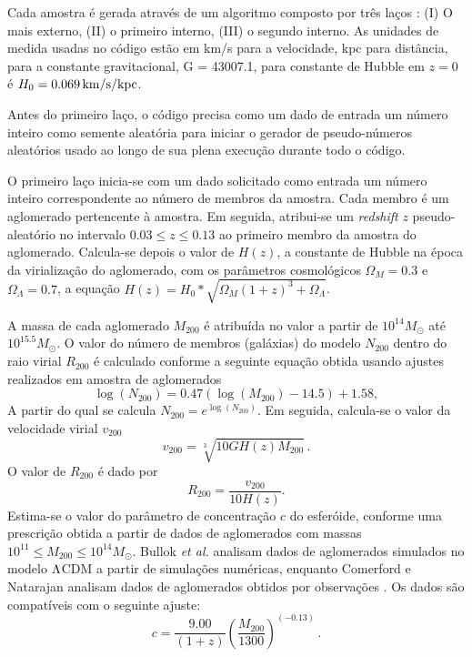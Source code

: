 \par Cada amostra \'e gerada atrav\'es de um algoritmo composto por tr\^es la\c cos : (I) O mais externo, (II) o primeiro interno, (III) o segundo interno. As unidades de medida usadas no c\'odigo est\~ao em km/s para a velocidade, kpc para dist\^ancia, para a constante gravitacional, G = 43007.1, para constante de Hubble em $z=0$ \'e $H_0 = 0.069 \, {\rm km/s/kpc}$.
\par Antes do primeiro la\c co, o c\'odigo precisa como um dado de entrada um n\'umero inteiro como semente aleat\'oria para iniciar o gerador de pseudo-n\'umeros aleat\'orios usado ao longo de sua plena execu\c c\~ao durante todo o c\'odigo. 
\par O primeiro la\c co inicia-se com um dado solicitado como entrada um n\'umero inteiro correspondente ao n\'umero de membros da amostra. Cada membro \'e um aglomerado pertencente \`a amostra. Em seguida, atribui-se um \textit{redshift} $z$ pseudo-aleat\'orio no intervalo $0.03 \leq z \leq 0.13$ ao primeiro membro da amostra do aglomerado. Calcula-se depois o valor de $H(z)$, a constante de Hubble na \'epoca da virializa\c c\~ao do aglomerado, com os par\^ametros cosmol\'ogicos $\Omega_M = 0.3$ e $\Omega_{\Lambda}=0.7$, a equa\c c\~ao $H(z) = H_0*\sqrt{\Omega_M(1+z)^3 + \Omega_{\Lambda}}$.

A massa de cada aglomerado $M_{200}$ \'e atribu\'ida no valor a partir de $10^{14} M_{\odot}$ at\'e $10^{15.5}M_{\odot}$. O valor do n\'umero de membros (gal\'axias) do modelo $N_{200}$ dentro do raio virial $R_{200}$ \'e calculado conforme a seguinte equa\c c\~ao obtida usando ajustes realizados em amostra de aglomerados\cite{andreon2012}
\begin{equation}
\log(N_{200}) = 0.47(\log(M_{200}) - 14.5) + 1.58,
\label{andreon}	
\end{equation}	
A partir do qual se calcula $N_{200} = e^{\log(N_{200})}$. Em seguida, calcula-se o valor da velocidade virial $v_{200}$\cite{springel1999}
\begin{equation}
v_{200} = \sqrt[3]{10GH(z)M_{200}} \, .
\label{velocidadevirial}
\end{equation}	
O valor de $R_{200}$ \'e dado por 
\begin{equation} R_{200} = \frac{v_{200}}{10H(z)}.
\label{rvirial}
\end{equation}
Estima-se o valor do par\^ametro de concentra\c c\~ao $c$ do esfer\'oide, conforme uma prescri\c c\~ao obtida a partir de dados de aglomerados com massas $10^{11} \leq M_{200} \leq 10^{14} M_{\odot}$\cite{Bullock}.  Bullok {\it et al.} analisam dados de aglomerados simulados no modelo ${\rm \Lambda}$CDM\cite{Bullock} a partir de simula\c c\~oes num\'ericas, enquanto Comerford e Natarajan analisam dados de aglomerados obtidos por observa\c c\~oes \cite{COMERFORD}. Os dados s\~ao compat\'iveis com o seguinte ajuste:
\begin{equation}
c = \frac{9.00}{(1+z)} \left(\frac{M_{200}}{1300}\right)^{(-0.13)} \, .	
\label{cparameter}
\end{equation}

